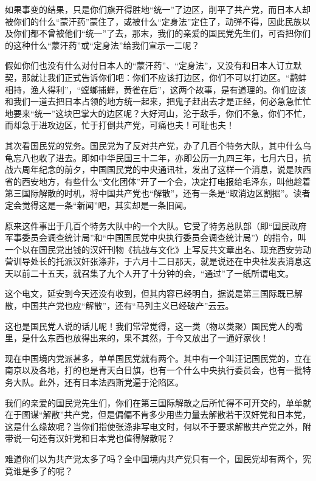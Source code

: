 如果事变的结果，只是你们旗开得胜地“统一”了边区，削平了共产党，而日本人却被你们的什么“蒙汗药”蒙住了，或被什么“定身法”定住了，动弹不得，因此民族以及你们都不曾被他们“统一”了去，那末，我们的亲爱的国民党先生们，可否把你们的这种什么“蒙汗药”或“定身法”给我们宣示一二呢？

假如你们也没有什么对付日本人的“蒙汗药”、“定身法”，又没有和日本人订立默契，那就让我们正式告诉你们吧：你们不应该打边区，你们不可以打边区。“鹬蚌相持，渔人得利”，“螳螂捕蝉，黄雀在后”，这两个故事，是有道理的。你们应该和我们一道去把日本占领的地方统一起来，把鬼子赶出去才是正经，何必急急忙忙地要来“统一”这块巴掌大的边区呢？大好河山，沦于敌手，你们不急，你们不忙，而却急于进攻边区，忙于打倒共产党，可痛也夫！可耻也夫！

其次看国民党的党务。国民党为了反对共产党，办了几百个特务大队，其中什么乌龟忘八也收了进去。即如中华民国三十二年，亦即公历一九四三年，七月六日，抗战六周年纪念的前夕，中国国民党的中央通讯社，发出了这样一个消息，说是陕西省的西安地方，有些什么“文化团体”开了一个会，决定打电报给毛泽东，叫他趁着第三国际解散的时机，将中国共产党也“解散”，还有一条是“取消边区割据”。读者定会觉得这是一条“新闻”吧，其实却是一条旧闻。

原来这件事出于几百个特务大队中的一个大队。它受了特务总队部（即“国民政府军事委员会调查统计局”和“中国国民党中央执行委员会调查统计局”）的指令，叫一个以在国民党出钱的汉奸刊物《抗战与文化》上写反共文章出名、现充西安劳动营训导处长的托派汉奸张涤非，于六月十二日那天，就是说还在中央社发表消息这天以前二十五天，就召集了九个人开了十分钟的会，“通过”了一纸所谓电文。

这个电文，延安到今天还没有收到，但其内容已经明白，据说是第三国际既已解散，中国共产党也应“解散”，还有“马列主义已经破产”云云。

这也是国民党人说的话儿呢！我们常常觉得，这一类（物以类聚）国民党人的嘴里，是什么东西也放得出来的，果不其然，于今又放出了一通好家伙！

现在中国境内党派甚多，单单国民党就有两个。其中有一个叫汪记国民党的，立在南京以及各地，打的也是青天白日旗，也有一个什么中央执行委员会，也有一批特务大队。此外，还有日本法西斯党遍于沦陷区。

我们的亲爱的国民党先生们，你们在第三国际解散之后所忙得不可开交的，单单就在于图谋“解散”共产党，但是偏偏不肯多少用些力量去解散若干汉奸党和日本党，这是什么缘故呢？当你们指使张涤非写电文时，何以不于要求解散共产党之外，附带说一句还有汉奸党和日本党也值得解散呢？

难道你们以为共产党太多了吗？全中国境内共产党只有一个，国民党却有两个，究竟谁是多了的呢？

